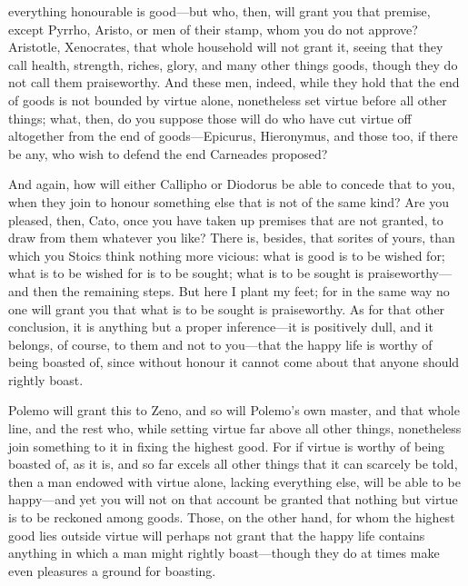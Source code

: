  everything honourable is good—but who, then, will grant you that premise, except Pyrrho, Aristo, or men of their stamp, whom you do not approve? Aristotle, Xenocrates, that whole household will not grant it, seeing that they call health, strength, riches, glory, and many other things goods, though they do not call them praiseworthy. And these men, indeed, while they hold that the end of goods is not bounded by virtue alone, nonetheless set virtue before all other things; what, then, do you suppose those will do who have cut virtue off altogether from the end of goods—Epicurus, Hieronymus, and those too, if there be any, who wish to defend the end Carneades proposed?

 And again, how will either Callipho or Diodorus be able to concede that to you, when they join to honour something else that is not of the same kind? Are you pleased, then, Cato, once you have taken up premises that are not granted, to draw from them whatever you like? There is, besides, that sorites of yours, than which you Stoics think nothing more vicious: what is good is to be wished for; what is to be wished for is to be sought; what is to be sought is praiseworthy—and then the remaining steps. But here I plant my feet; for in the same way no one will grant you that what is to be sought is praiseworthy. As for that other conclusion, it is anything but a proper inference—it is positively dull, and it belongs, of course, to them and not to you—that the happy life is worthy of being boasted of, since without honour it cannot come about that anyone should rightly boast.

 Polemo will grant this to Zeno, and so will Polemo's own master, and that whole line, and the rest who, while setting virtue far above all other things, nonetheless join something to it in fixing the highest good. For if virtue is worthy of being boasted of, as it is, and so far excels all other things that it can scarcely be told, then a man endowed with virtue alone, lacking everything else, will be able to be happy—and yet you will not on that account be granted that nothing but virtue is to be reckoned among goods. Those, on the other hand, for whom the highest good lies outside virtue will perhaps not grant that the happy life contains anything in which a man might rightly boast—though they do at times make even pleasures a ground for boasting.

